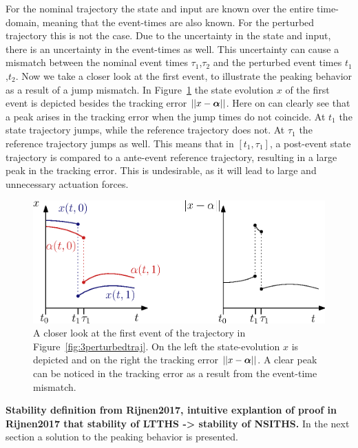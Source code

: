 \documentclass[../DC2017114Bouma.tex]{subfiles}
\begin{document}
For the nominal trajectory the state and input are known over the entire time-domain, meaning that the event-times are also known. For the perturbed trajectory this is not the case. Due to the uncertainty in the state and input, there is an uncertainty in the event-times as well. This uncertainty can cause a mismatch between the nominal event times $\tau_1$,$\tau_2$ and the perturbed event times $t_1$,$t_2$. Now we take a closer look at the first event, to illustrate the peaking behavior as a result of a jump mismatch. In Figure~\ref{fig:3peakerror} the state evolution $x$ of the first event is depicted besides the tracking error $||x-\boldsymbol{\alpha}||$. Here on can clearly see that a peak arises in the tracking error when the jump times do not coincide. At $t_1$ the state trajectory jumps, while the reference trajectory does not. At $\tau_1$ the reference trajectory jumps as well. This means that in $[t_1,\tau_1]$, a post-event state trajectory is compared to a ante-event reference trajectory, resulting in a large peak in the tracking error. This is undesirable, as it will lead to large and unnecessary actuation forces.
\begin{figure}[h]
\centering
\includegraphics[width=.66\textwidth]{peakerror.eps}\caption{A closer look at the first event of the trajectory in Figure~\ref{fig:3perturbedtraj}. On the left the state-evolution $x$ is depicted and on the right the tracking error $||x-\boldsymbol{\alpha}||$. A clear peak can be noticed in the tracking error as a result from the event-time mismatch.} \label{fig:3peakerror}
\end{figure}

\textbf{Stability definition from Rijnen2017, intuitive explantion of proof in Rijnen2017 that stability of LTTHS -> stability of NSITHS.} In the next section a solution to the peaking behavior is presented.
\end{document}
